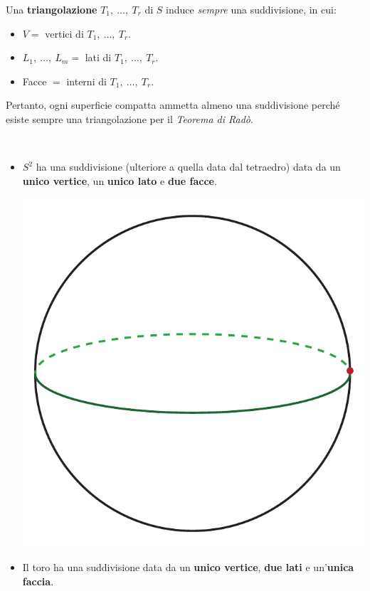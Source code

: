 \begin{example}
	Una \textbf{triangolazione} $T_1,\ \ldots,\ T_r$ di $S$ induce \textit{sempre} una suddivisione, in cui:
	\begin{itemize}
		\item $V=$ vertici di $T_1,\ \ldots,\ T_r$.
		\item $L_1,\ \ldots,\ L_m=$ lati di $T_1,\ \ldots,\ T_r$.
		\item Facce $=$ interni di $T_1,\ \ldots,\ T_r$.
	\end{itemize}
Pertanto, ogni superficie compatta ammetta almeno una suddivisione perché esiste sempre una triangolazione per il \textit{Teorema di Radò}.
\end{example}
\begin{examples}~{}
	\begin{itemize}
		\item $S^2$ ha una suddivisione (ulteriore a quella data dal tetraedro) data da un \textcolor{redill}{\textbf{unico vertice}}, un \textcolor{greenill}{\textbf{unico lato}} e \textcolor{blueill}{\textbf{due facce}}.
			\begin{center}
				\includegraphics[trim=0cm 0cm 0cm 0cm, clip, scale=0.35]{images/spheresubdivision.pdf}
			\end{center}
		\item Il toro ha una suddivisione data da un \textcolor{redill}{\textbf{unico vertice}}, \textcolor{greenill}{\textbf{due lati}} e un'\textcolor{blueill}{\textbf{unica faccia}}.	

\end{itemize}
\end{examples}
